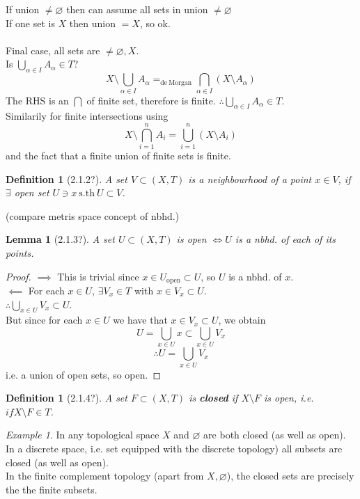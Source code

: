 \documentclass{article}
\newcommand{\sth}{\mathrm{s.th}\ }
\renewcommand{\emptyset}{\varnothing}
\newtheorem{slemma}[stheorem]{Lemma}
\newtheorem{sdefinition}[stheorem]{Definition}
\theoremstyle{remark}
\theoremstyle{example}
\theoremstyle{examples}
\newtheorem*{example}{Example}
\begin{document}
\begin{enumerate}
		If union $\neq \emptyset$ then can assume all sets in union $\neq \emptyset$\\
		If one set is $X$ then union $=X$, so ok.\\\\
		Final case, all sets are $\neq \emptyset,X$. \\
		Is $\bigcup_{\alpha \in I} A_\alpha \in T$?\\
		\[X \setminus \bigcup_{\alpha \in I}A_\alpha =_{\mathrm{de\ Morgan}} \bigcap_{\alpha \in I} (X \setminus A_\alpha) \]
		The RHS is an $\bigcap$ of finite set, therefore is finite. $\therefore \bigcup_{\alpha \in I}A_\alpha \in T$.\\
		Similarily for finite intersections using \[X \setminus \bigcap_{i=1}^n A_i = \bigcup_{i=1}^n \left(X \setminus A_i \right) \] and the fact that a finite union of finite sets is finite.
	\end{enumerate}

	\begin{sdefinition}[2.1.2?]
		A set $V \subset (X,T)$ is a neighbourhood of a point $x \in V$, if $\exists$ open set $U \ni x\ \sth U \subset V$.
	\end{sdefinition}
	(compare metris space concept of nbhd.)
	
	\begin{slemma}[2.1.3?]
		\label{uopeniffnbhd}
		A set $U \subset(X,T)$ is open $\iff U$ is a nbhd. of each of its points.
	\end{slemma}
	\begin{proof}
		$\implies$ This is trivial since $x \in U_{\mathrm{open}} \subset U$, so $U$ is a nbhd. of $x$.\\
		$\impliedby$ For each $x \in U$, $\exists V_x \in T$ with $x \in V_x \subset U$.\\
		$\therefore \bigcup_{x \in U} V_x \subset U$.\\
		But since for each $x \in U$ we have that $x \in V_x \subset U$, we obtain \[ U= \bigcup_{x \in U} {x} \subset \bigcup_{x \in U} V_x \]
		\[\therefore U=\bigcup_{x \in U} V_x \] i.e. a union of open sets, so open.
	\end{proof}

	\begin{sdefinition}[2.1.4?]
		A set $F \subset (X,T)$ is \textbf{closed} if $X \setminus F$ is open, i.e. $if X \setminus F \in T$.
	\end{sdefinition}
	\begin{example}
		In any topological space $X$ and $\emptyset$ are both closed (as well as open).\\
		In a discrete space, i.e. set equipped with the discrete topology) all subsets are closed (as well as open).\\
		In the finite complement topology (apart from $X, \emptyset$), the closed sets are precisely the the finite subsets.
	\end{example}
\end{document}
